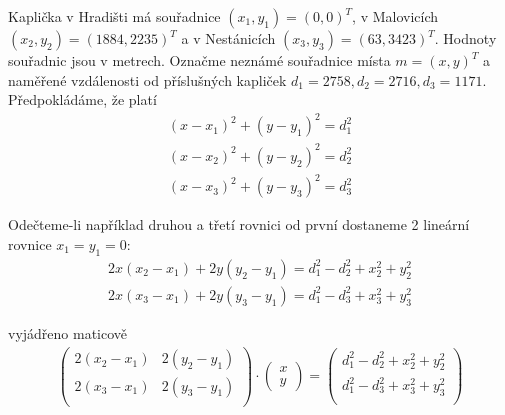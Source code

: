 \documentclass[12pt, a4paper]{article}
\begin{document}
Kaplička v Hradišti má souřadnice $(x_1, y_1) = (0, 0)^T$, v Malovicích $(x_2, y_2) = (1884, 2235)^T$ a v Nestánicích $(x_3, y_3) = (63, 3423)^T$. Hodnoty souřadnic jsou v metrech. Označme neznámé souřadnice místa $m=(x, y)^T$ a naměřené vzdálenosti od příslušných kapliček $d_1 = 2758, d_2 = 2716, d_3=1171$. Předpokládáme, že platí
\begin{gather*}
(x-x_1)^2 + (y-y_1)^2 = d_1^2\\
(x-x_2)^2 + (y-y_2)^2 = d_2^2\\
(x-x_3)^2 + (y-y_3)^2 = d_3^2
\end{gather*}

Odečteme-li například druhou a třetí rovnici od první dostaneme 2 lineární rovnice $x_1 = y_1 = 0 $:
\begin{gather*}
2x(x_2 - x_1)+2y(y_2 - y_1) = d_1^2 - d_2^2 + x_2^2+y_2^2\\
2x(x_3 - x_1)+2y(y_3 - y_1) = d_1^2 - d_3^2 + x_3^2+y_3^2
\end{gather*}

vyjádřeno maticově
\begin{gather*}
\begin{pmatrix}
2(x_2 - x_1) & 2(y_2 - y_1)\\
2(x_3 - x_1) & 2(y_3 - y_1)\\
\end{pmatrix} \cdot 
\begin{pmatrix}
x\\
y
\end{pmatrix} = 
\begin{pmatrix}
d_1^2 - d_2^2 + x_2^2+y_2^2\\
d_1^2 - d_3^2 + x_3^2+y_3^2\\
\end{pmatrix}
\end{gather*}
\end{document}
